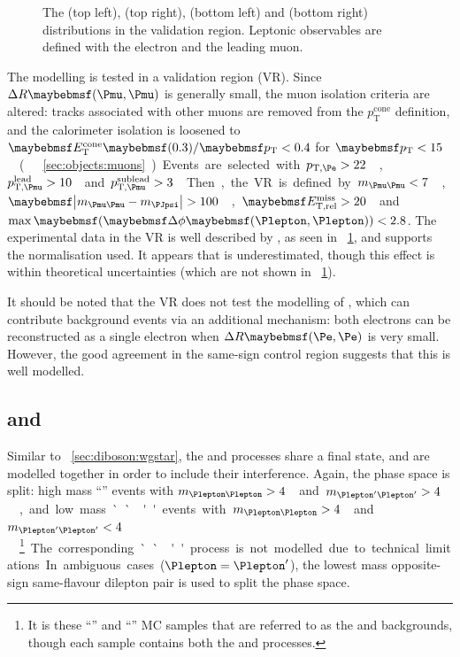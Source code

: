 \begin{figure}[t]
	\caption{The \ptsubleadlep (top left), \mll (top right), \mt (bottom left) and \njets 
	(bottom right) distributions in the \Wgstar validation region. Leptonic observables are 
	defined with the electron and the leading muon.}
	\label{fig:wgstar:vr}
\end{figure}

The \Wgstar modelling is tested in a \HepProcess{\Wgstar \HepTo \Pe\Pnu\Pmu\Pmu} validation 
region (VR). Since $\Delta R\parenths{\Pmu,\Pmu}$ is generally small, the muon isolation 
criteria are altered: tracks associated with other muons are removed from the 
$p_{\text{T}}^{\text{cone}}$ definition, and the calorimeter isolation is loosened to 
$\etcone{0.3}/\pt < 0.4$ for \unit{$\pt < 15$}{\GeV} (\cf \Section~\ref{sec:objects:muons}). 
Events are selected with \unit{$p_{\text{T,\Pe}} > 22$}{\GeV}, 
\unit{$p_{\text{T,\Pmu}}^{\text{lead}} > 10$}{\GeV} and 
\unit{$p_{\text{T,\Pmu}}^{\text{sublead}} > 3$}{\GeV}. 
Then, the VR is defined by \unit{$m_{\HepProcess{\Pmu\Pmu}} < 7$}{\GeV}, 
\unit{$\mods{m_{\HepProcess{\Pmu\Pmu}} - m_{\PJpsi}} > 100$}{\MeV}, 
\unit{$\metrel > 20$}{\GeV} and $\max\parenths{\dphill} < 2.8$.
The experimental data in the VR is well described by \sherpa, as seen in 
\Figure~\ref{fig:wgstar:vr}, and supports the normalisation used. It appears that \njets is 
underestimated, though this effect is within theoretical uncertainties (which are not shown 
in \Figure~\ref{fig:wgstar:vr}).

It should be noted that the \Wgstar VR does not test the modelling of 
\HepProcess{\Wgstar \HepTo \Plepton\Pnu\Pe\Pe}, which can contribute background events via an 
additional mechanism: both electrons can be reconstructed as a single electron when 
$\Delta R\parenths{\Pe,\Pe}$ is very small. However, the good agreement in the same-sign 
control region suggests that this is well modelled.



\subsection{\ZZ and \Zgstar}
\label{sec:diboson:zz}

Similar to \Section~\ref{sec:diboson:wgstar}, the \ZZ and \Zgstar processes share a 
 final state, and are modelled together in 
order to include their interference. Again, the phase space is split: high mass 
``\ZZ'' events with \unit{$m_{\HepProcess{\Plepton\Plepton}} > 4$}{\GeV} and 
\unit{$m_{\HepProcess{\Plepton'\Plepton'}} > 4$}{\GeV}, and low mass ``\Zgstar'' events with 
\unit{$m_{\HepProcess{\Plepton\Plepton}} > 4$}{\GeV} and 
\unit{$m_{\HepProcess{\Plepton'\Plepton'}} < 4$}{\GeV}.\footnote{
	It is these ``\ZZ'' and ``\Zgstar''	MC samples that are referred to as the \ZZ and 
	\Zgstar backgrounds, though each sample contains both the \ZZ and \Zgstar processes.
}
The corresponding ``\HepProcess{\Pgammastar\Pgammastar}'' process is not modelled due to 
technical limitations. In ambiguous cases ($\Plepton = \Plepton'$), the lowest mass 
opposite-sign same-flavour dilepton pair is used to split the phase space.

